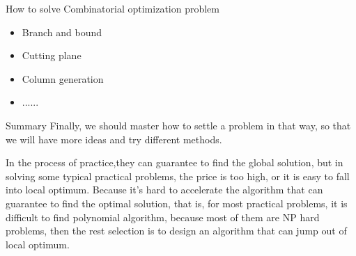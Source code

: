    \begin{frame}{How to solve Combinatorial optimization problem}
     \begin{itemize}
       \item Branch and bound
       \item Cutting plane
       \item Column generation
       \item ......
     \end{itemize}

   \end{frame}

   \begin{frame}{Summary}
     Finally, we should master how to settle a problem in that way, so that we will have more ideas and try different methods.

     In the process of practice,they can guarantee to find the global solution, but in solving some typical practical problems, the price is too high, or it is easy to fall into local optimum. Because it's hard to accelerate the algorithm that can guarantee to find the optimal solution, that is, for most practical problems, it is difficult to find polynomial algorithm, because most of them are NP hard problems, then the rest selection is to design an algorithm that can jump out of local optimum.
   \end{frame}
